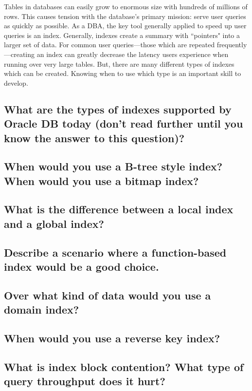 \documentclass[12pt]{article}
\begin{document}
Tables in databases can easily grow to enormous size with hundreds of millions
of rows.  This causes tension with the database's primary mission: serve user
queries as quickly as possible.  As a DBA, the key tool generally applied to
speed up user queries is an index.  Generally, indexes create a summary with
``pointers" into a larger set of data.  For common user queries---those which
are repeated frequently---creating an index can greatly decrease the latency
users experience when running over very large tables.  But, there are many
different types of indexes which can be created.  Knowing when to use which
type is an important skill to develop.

\subsection{What are the types of indexes supported by Oracle DB today (don't
read further until you know the answer to this question)?}

\subsection{When would you use a B-tree style index?  When would you use a
bitmap index?}

\subsection{What is the difference between a local index and a global index?}

\subsection{Describe a scenario where a function-based index would be a good
choice.}

\subsection{Over what kind of data would you use a domain index?}

\subsection{When would you use a reverse key index?}

\subsection{What is index block contention? What type of query throughput does
it hurt?}
\end{document}
